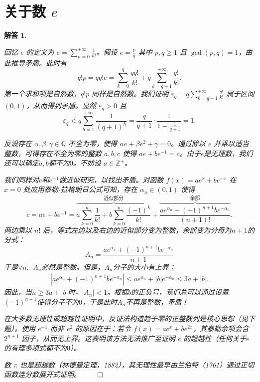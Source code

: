 \documentclass[12pt,UTF8]{ctexbook}
\theoremstyle{exercisestyle}
\theoremstyle{solutionstyle}
\newtheorem*{solution*}{解答}
\newenvironment{solution}
  {\begin{solution*}}
  {\hfill\ensuremath{\qed}\end{solution*}}
\begin{document}
\section{关于数 $e$}
\begin{solution}
  \begin{subquestions}
    \item 回忆 $e$ 的定义为 $e = \sum_{n=0}^{+\infty} \frac{1}{n!}$。假设 $e = \frac{p}{q}$ 其中 $p, q \geqslant 1$ 且 $\gcd(p,q) = 1$，由此推导矛盾。此时有
    $$
    q!p = qq!e = \sum_{k=0}^{q} \frac{qq!}{k!} + q \sum_{k=q+1}^{+\infty} \frac{q!}{k!}.
    $$
    第一个求和项是自然数，$q!p$ 同样是自然数。我们证明 $\varepsilon_q = q \sum_{k=q+1}^{+\infty} \frac{q!}{k!}$ 属于区间 $(0,1)$，从而得到矛盾。显然 $\varepsilon_q > 0$ 且
    $$
    \varepsilon_q < q \sum_{h=1}^{+\infty} \frac{1}{(q+1)^h} = \frac{q}{q+1} \cdot \frac{1}{1 - \frac{1}{q+1}} = 1.
    $$
    \item 反设存在 $\alpha, \beta, \gamma \in \mathbb{Q}$ 不全为零，使得 $\alpha e + \beta e^2 + \gamma = 0$。通过除以 $e$ 并乘以适当整数，可得存在不全为零的整数 $a, b, c$ 使得 $ae + be^{-1} = c$。由于$e$是无理数，我们还可以确定$a,b$都不为$0$。不妨设 $a \in \mathbb{Z}^+$。
    
    我们同样对$e$和$e^{-1}$做近似研究，以找出矛盾。对函数 $f(x) = ae^x + be^{-x}$ 在 $x=0$ 处应用泰勒-拉格朗日公式可知，存在 $\alpha_n \in (0,1)$ 使得
    $$
    c = ae + be^{-1} = \overbrace{a \sum_{k=0}^{n} \frac{1}{k!} + b \sum_{k=0}^{n} \frac{(-1)^k}{k!}}^{\text{近似部分}} + \overbrace{\frac{ae^{\alpha_n} + (-1)^{n+1}be^{-\alpha_n}}{(n+1)!}}^{\text{余部}}.
    $$
    两边乘以 $n!$ 后，等式左边以及右边的近似部分变为整数，余部变为分母为$n+1$的分式：
    $$A_n = \frac{ae^{\alpha_n} + (-1)^{n+1}be^{-\alpha_n}}{n+1}$$ 
    于是$\forall n,\;\,A_n$必然是整数。但是，$A_n$分子的大小有上界：
    \begin{align*}
        \left|ae^{\alpha_n} + (-1)^{n+1}be^{-\alpha_n}\right| \leqslant ae^{\alpha_n} + |b|e^{-\alpha_n} \leqslant 3a + |b|.
    \end{align*}
    因此，当$n \geqslant 3a + |b|$时，$|A_n| < 1$。根据$b$的正负号，我们总可以通过设置$(-1)^{n+1}$使得分子不为$0$，于是此时$A_n$不再是整数，矛盾！
  \end{subquestions}
  
  在大多数无理性或超越性证明中，反证法构造趋于零的正整数列是核心思想（见下题）。使用 $e^{-1}$ 而非 $e^2$ 的原因在于：若令 $f(x) = ae^x + be^{2x}$，其泰勒余项会含 $2^{n+1}$ 因子，从而无上界。这表明该方法无法推广至证明 $e$ 的超越性（任何关于$e$的有理多项式都不为$0$）。
  
  数 $\pi$ 也是超越数（林德曼定理，1882），其无理性最早由兰伯特（1761）通过正切函数连分数展开式证明。
\end{solution}
\end{document}

